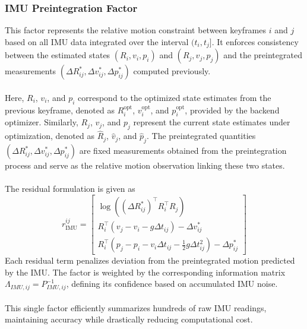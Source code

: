 \subsubsection{IMU Preintegration Factor}
This factor represents the relative motion constraint between keyframes $i$ and $j$ based on all IMU data integrated over the interval $(t_i, t_j]$. It enforces consistency between the estimated states $(R_i, v_i, p_i)$ and $(R_j, v_j, p_j)$ and the preintegrated measurements $(\Delta R_{ij}^{*}, \Delta v_{ij}^{*}, \Delta p_{ij}^{*})$ computed previously.  
\\ \\
Here, $R_i$, $v_i$, and $p_i$ correspond to the optimized state estimates from the previous keyframe, denoted as $R_i^{\text{opt}}$, $v_i^{\text{opt}}$, and $p_i^{\text{opt}}$, provided by the backend optimizer. Similarly, $R_j$, $v_j$, and $p_j$ represent the current state estimates under optimization, denoted as $\hat{R}_j$, $\hat{v}_j$, and $\hat{p}_j$. The preintegrated quantities $(\Delta R_{ij}^{*}, \Delta v_{ij}^{*}, \Delta p_{ij}^{*})$ are fixed measurements obtained from the preintegration process and serve as the relative motion observation linking these two states.
\\ \\
The residual formulation is given as
$$
    r_{\text{IMU}}^{ij} =
    \begin{bmatrix}
        \log((\Delta R_{ij}^{*})^\top R_i^\top R_j) \\
        R_i^\top (v_j - v_i - g\Delta t_{ij}) - \Delta v_{ij}^{*} \\
        R_i^\top (p_j - p_i - v_i \Delta t_{ij} - \tfrac{1}{2} g \Delta t_{ij}^2) - \Delta p_{ij}^{*}
    \end{bmatrix}
$$
Each residual term penalizes deviation from the preintegrated motion predicted by the IMU. The factor is weighted by the corresponding information matrix $\Lambda_{IMU,ij} = P_{IMU,ij}^{-1}$, defining its confidence based on accumulated IMU noise. 
\\ \\
This single factor efficiently summarizes hundreds of raw IMU readings, maintaining accuracy while drastically reducing computational cost.



